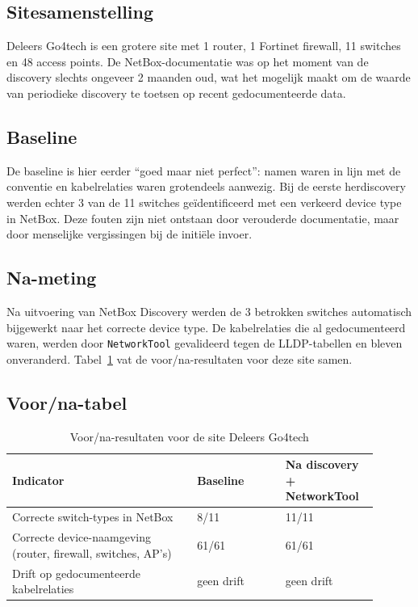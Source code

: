 \subsection{Site\-samen\-stelling}

Deleers Go4tech is een grotere site met 1 router, 1 Fortinet firewall, 11 switches en 48 access points. De NetBox-documentatie was op het moment van de discovery slechts ongeveer 2 maanden oud, wat het mogelijk maakt om de waarde van periodieke discovery te toetsen op recent gedocumenteerde data.

\subsection{Baseline}

De baseline is hier eerder ``goed maar niet perfect'': namen waren in lijn met de conventie en kabelrelaties waren grotendeels aanwezig. Bij de eerste herdiscovery werden echter 3 van de 11 switches geïdentificeerd met een verkeerd device type in NetBox. Deze fouten zijn niet ontstaan door verouderde documentatie, maar door menselijke vergissingen bij de initiële invoer.

\subsection{Na-meting}

Na uitvoering van NetBox Discovery werden de 3 betrokken switches automatisch bijgewerkt naar het correcte device type. De kabelrelaties die al gedocumenteerd waren, werden door \texttt{NetworkTool} gevalideerd tegen de LLDP-tabellen en bleven onveranderd. Tabel~\ref{tab:deleers-voor-na} vat de voor/na-resultaten voor deze site samen.

\subsection{Voor/na-tabel}

\begin{table}[H]
  \centering
  \caption[Voor/na-resultaten Deleers Go4tech]{Voor/na-resultaten voor de site Deleers Go4tech}
  \label{tab:deleers-voor-na}
  \begin{tabular}{p{0.46\linewidth} p{0.22\linewidth} p{0.22\linewidth}}
    \toprule
    \textbf{Indicator} & \textbf{Baseline} & \textbf{Na discovery + NetworkTool} \\
    \midrule
    Correcte switch-types in NetBox & 8/11 & 11/11 \\
    Correcte device-naamgeving (router, firewall, switches, AP's) & 61/61 & 61/61 \\
    Drift op gedocumenteerde kabelrelaties & geen drift & geen drift \\
    \bottomrule
  \end{tabular}
\end{table}

